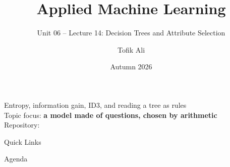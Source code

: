 \documentclass[aspectratio=169]{beamer}
\title[Applied Machine Learning]{Applied Machine Learning}
\subtitle{Unit 06 -- Lecture 14: Decision Trees and Attribute Selection}
\author{Tofik Ali}
\institute{School of Computer Science, UPES Dehradun}
\date{Autumn 2026}
\begin{document}
\UPESCoverFrame
\setcounter{framenumber}{0}

\begin{frame}
  \titlepage
  \begin{center}
    \footnotesize Entropy, information gain, ID3, and reading a tree as
    rules\\[0.25em]
    \footnotesize Topic focus: \textbf{a model made of questions, chosen by
    arithmetic}\\[0.25em]
    \footnotesize Repository: \texttt{\AMLRepoURL}
  \end{center}
  \slidesources{\AMLUnitVISources}
\end{frame}

\begin{frame}{Quick Links}
  \centering
  \hyperlink{sec:tree}{}\hspace{0.4em}
  \hyperlink{sec:entropy}{}\hspace{0.4em}
  \hyperlink{sec:gain}{}\hspace{0.4em}
  \hyperlink{sec:id3}{}\\[0.6em]
  \hyperlink{sec:rules}{}\hspace{0.4em}
  \hyperlink{sec:gini}{}\hspace{0.4em}
  \hyperlink{sec:gainratio}{}\hspace{0.4em}
  \hyperlink{sec:prune}{}\hspace{0.4em}
  \hyperlink{sec:summary}{}
\end{frame}

\begin{frame}{Agenda}
  \tableofcontents
\end{frame}
\end{document}
